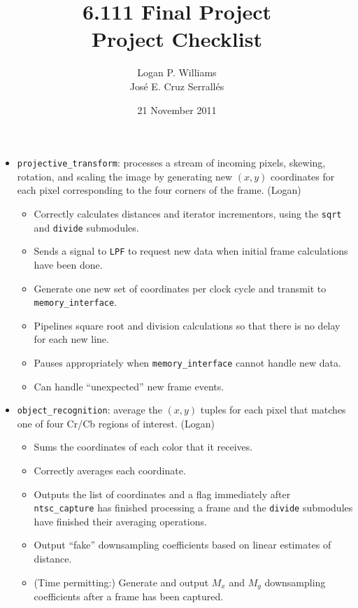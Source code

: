 \documentclass{article}
\title{6.111 Final Project\\Project Checklist}
\date{21 November 2011}
\author{Logan P. Williams\\Jos\'{e} E. Cruz Serrall\'{e}s}
\begin{document}
\maketitle

\begin{itemize}
\item[] {\tt projective\_transform}: processes a stream of incoming pixels, skewing, rotation, and scaling the image by generating new $(x,y)$ coordinates for each pixel corresponding to the four corners of the frame. (Logan)
	\begin{itemize}
	\item Correctly calculates distances and iterator incrementors, using the {\tt sqrt} and {\tt divide} submodules. 
	\item Sends a signal to {\tt LPF} to request new data when initial frame calculations have been done.
	\item Generate one new set of coordinates per clock cycle and transmit to {\tt memory\_interface}.
	\item Pipelines square root and division calculations so that there is no delay for each new line.
	\item Pauses appropriately when {\tt memory\_interface} cannot handle new data.
	\item Can handle ``unexpected'' new frame events.
	\end{itemize}

\item[] {\tt object\_recognition}: average the $(x,y)$ tuples for each pixel that matches one of four Cr/Cb regions of interest. (Logan)
	\begin{itemize}
	\item Sums the coordinates of each color that it receives.
	\item Correctly averages each coordinate.
	\item Outputs the list of coordinates and a flag immediately after {\tt ntsc\_capture} has finished processing a frame and the {\tt divide} submodules have finished their averaging operations.
	\item Output ``fake'' downsampling coefficients based on linear estimates of distance.
	\item (Time permitting:) Generate and output $M_x$ and $M_y$ downsampling coefficients after a frame has been captured.
	\end{itemize}


\end{itemize}
\end{document}
